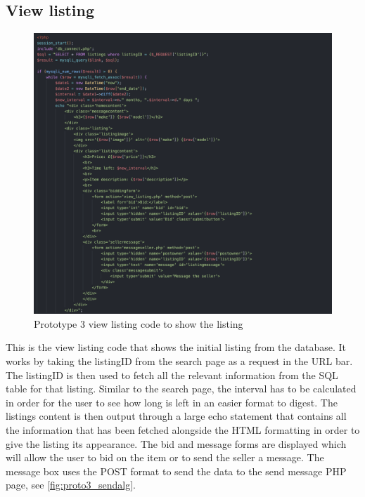 \subsection{View listing}
\begin{figure}[H]
    \centering
    \includegraphics[scale=0.5]{ch3_developing/proto3/view1.png}
    \caption{Prototype 3 view listing code to show the listing}
    \label{fig:proto3_view1}
\end{figure}
This is the view listing code that shows the initial listing from the database. It works by taking the listingID from the search page as a request in the URL bar. The listingID is then used to fetch all the relevant information from the SQL table for that listing. Similar to the search page, the interval has to be calculated in order for the user to see how long is left in an easier format to digest. The listings content is then output through a large echo statement that contains all the information that has been fetched alongside the HTML formatting in order to give the listing its appearance. The bid and message forms are displayed which will allow the user to bid on the item or to send the seller a message. The message box uses the POST format to send the data to the send message PHP page, see \ref{fig:proto3_sendalg}.
